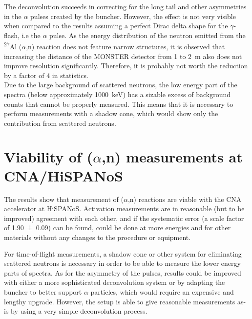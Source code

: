 \documentclass[a4paper,12pt]{report}
\newcommand{\an}{($\alpha$,n) }
\newcommand{\Aliso}{\textsuperscript{27}Al }
\begin{document}
The deconvolution succeeds in correcting for the long tail and other asymmetries in the $\alpha$ pulses created by the buncher.
However, the effect is not very visible when compared to the results assuming a perfect Dirac delta shape for the $\gamma$-flash, i.e the $\alpha$ pulse.
As the energy distribution of the neutron emitted from the \Aliso\an reaction does not feature narrow structures, it is observed that increasing the distance of the MONSTER detector from 1 to \qty{2}{\m} also does not improve resolution significantly.
Therefore, it is probably not worth the reduction by a factor of 4 in statistics.
\\

Due to the large background of scattered neutrons, the low energy part of the spectra (below approximately \qty{1000}{\keV}) has a sizable excess of background counts that cannot be properly measured.
This means that it is necessary to perform measurements with a shadow cone, which would show only the contribution from scattered neutrons.

\section{Viability of \an measurements at CNA/HiSPANoS}
The results show that measurement of \an reactions are viable with the CNA accelerator at HiSPANoS.
Activation measurements are in reasonable (but to be improved) agreement with each other, and if the systematic error (a scale factor of \num{1.90(9)}) can be found, could be done at more energies and for other materials without any changes to the procedure or equipment.

For time-of-flight measurements, a shadow cone or other system for eliminating scattered neutrons is necessary in order to be able to measure the lower energy parts of spectra.
As for the asymmetry of the pulses, results could be improved with either a more sophisticated deconvolution system or by adapting the buncher to better support $\alpha$ particles, which would require an expensive and lengthy upgrade.
However, the setup is able to give reasonable measurements as-is by using a very simple deconvolution process.
\end{document}
